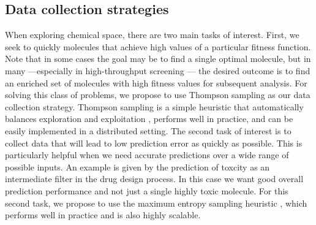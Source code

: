 \subsection{Data collection strategies}

When exploring chemical space, there are two main tasks of interest. First, we seek to quickly molecules that achieve high values of a particular fitness function.  Note that in some cases the goal may be to find a single optimal molecule, but in many ---especially in high-throughput screening \cite{Pyzer_Knapp_2015a}--- the desired outcome is to find an enriched set of molecules with high fitness values for subsequent analysis. 
For solving this class of problems, we propose to use Thompson sampling \cite{Thompson_1933} as our data collection strategy. Thompson sampling is a simple heuristic that automatically balances exploration and exploitation \cite{Chapelle2011}, performs well in practice, and can be easily implemented in a distributed setting. The second task of interest is to collect data that will lead to low prediction error as quickly as possible. This is particularly helpful when we need accurate predictions over a wide range of possible inputs. An example is given by the prediction of toxcity as an intermediate filter in the drug design process. In this case we want good overall prediction performance and not just a single highly toxic molecule. For this second task, we propose to use the maximum entropy sampling heuristic \cite{MacKay_1992}, which performs well in practice and is also highly scalable.